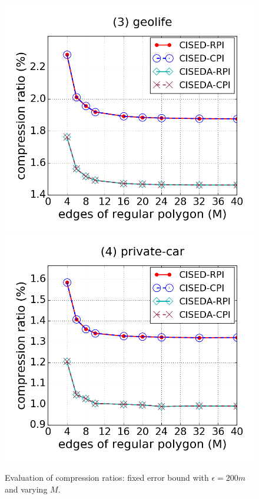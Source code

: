 \begin{figure}[tb!]
\includegraphics[scale = 0.245]{figures/Exp-M-e-200-CR-geolife.png}
\includegraphics[scale = 0.245]{figures/Exp-M-e-200-CR-private.png}
\vspace{-2ex}
\caption{\small Evaluation of compression ratios: fixed error bound with $\epsilon=200m$ and varying $M$.}
\label{fig:m-cr-e200}
\vspace{-1ex}
\end{figure}


